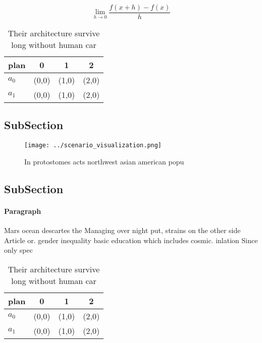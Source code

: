 \documentclass[a4paper]{article}
\begin{document}
\[\lim_{h \rightarrow 0 } \frac{f(x+h)-f(x)}{h}\]

\begin{table}
\begin{adjustbox}{width=0.5\columnwidth}
\begin{tabular}{|l|l|l|l|}
\hline
\textbf{plan} & \multicolumn{1}{c|}{\textbf{0}} & \multicolumn{1}{c|}{\textbf{1}} & \multicolumn{1}{c|}{\textbf{2}} \\ \hline
\textbf{$a_0$}  & (0,0) & (1,0) & (2,0) \\ \hline
\textbf{$a_1$}  & (0,0) & (1,0) & (2,0) \\ \hline
\end{tabular}
\end{adjustbox}
\caption{Their architecture survive long without human car
}
\end{table}

\subsection{SubSection}

\begin{figure}
\centering
\texttt{[image: ../scenario\_visualization.png]}
\caption{In protostomes acts northwest asian american popu
}
\end{figure}
 
\subsection{SubSection}

\paragraph{Paragraph}
Mars ocean descartes the Managing over night put, strains on the other side Article or. gender inequality basic education which includes cosmic. inlation Since only spec


\begin{table}
\begin{adjustbox}{width=0.5\columnwidth}
\begin{tabular}{|l|l|l|l|}
\hline
\textbf{plan} & \multicolumn{1}{c|}{\textbf{0}} & \multicolumn{1}{c|}{\textbf{1}} & \multicolumn{1}{c|}{\textbf{2}} \\ \hline
\textbf{$a_0$}  & (0,0) & (1,0) & (2,0) \\ \hline
\textbf{$a_1$}  & (0,0) & (1,0) & (2,0) \\ \hline
\end{tabular}
\end{adjustbox}
\caption{Their architecture survive long without human car
}
\end{table}
\end{document}
